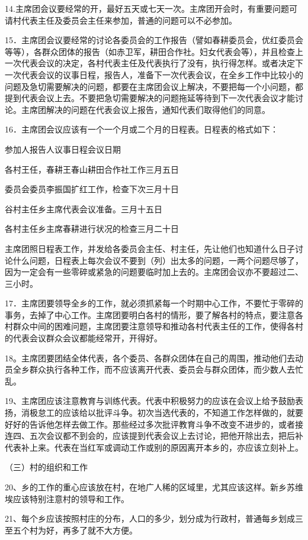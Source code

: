 14.主席团会议要经常的开，最好五天或七天一次。主席团开会时，有重要问题可请村代表主任及委员会主任来参加，普通的问题可以不必参加。

15．主席团会议要经常的讨论各委员会的工作报告（譬如春耕委员会，优红委员会等等），各群众团体的报告（如赤卫军，耕田合作社。妇女代表会等），并且检查上一次代表会议的决定，各村代表主任及代表执行了没有，执行得怎样。或者决定下一次代表会议的议事日程，报告人，准备下一次代表会议，在全乡工作中比较小的问题及急切需要解决的问题，都要在主席团会议上解决，不要把每一个小问题，都提到代表会议上去。不要把急切需要解决的问题拖延等待到下一次代表会议才能讨论。主席团解决的问题在代表会议上报告，通知代表们取得他们的同意。

16．主席团会议应该有一个一个月或二个月的日程表。日程表的格式如下：

参加人报告人议事日程会议日期

各村王任，春耕王春山耕田合作社工作三月五日

委员会委员李振国扩红工作，检查下次三月十日

谷村主任乡主席代表会议准备。三月十五日

各村主任乡主席春耕进行状况的检查三月二十日

主席团照日程表工作，并发给各委员会主任、村主任，先让他们也知道什么日子讨论什么问题，日程表上每次会议不要到（列）出太多的问题，一两个问题尽够了，因为一定会有一些零碎或紧急的问题要临时加上去的。主席团会议亦不要超过二、三小时。

17．主席团要领导全乡的工作，就必须抓紧每一个时期中心工作，不要忙于零碎的事务，去掉了中心工作。主席团要明白各村的情形，要了解各村的特点，要注意各村群众中间的困难问题，主席团要注意领导和推动各村代表主任的工作，使得各村的代表会议群众会议都能经常开，开得好。

18。主席团要团结全体代表，各个委员、各群众团体在自己的周围，推动他们去动员全乡群众执行各种工作，而不应该离开代表、委员会与群众团体，而少数人去忙乱。

19、主席团应该注意教育与训练代表。代表中积极努力的应该在会议上给予鼓励表扬，消极怠工的应该给以批评斗争。初次当选代表的，不知道工作怎样做的，就要好好的告诉他怎样去做工作。那些经过多次批评教育斗争不改变不进步的，或者接连四、五次会议都不到会的，应该提到代表会议上去讨论，把他开除出去，把后补代表补上来。代表在当红军或调动工作或别的原因离开本乡的，亦应该立刻补上。

（三）村的组织和工作

20、乡的工作的重心应该放在村，在地广人稀的区域里，尤其应该这样。新乡苏维埃应该特别注意村的领导和工作。

21、每个乡应该按照村庄的分布，人口的多少，划分成为行政村，普通每乡划成三至五个村为好，再多了就不大方便。

